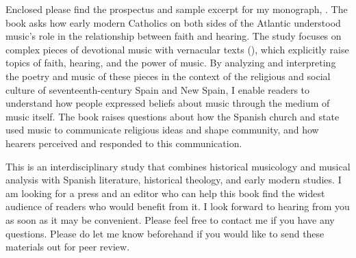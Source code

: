 Enclosed please find the prospectus and sample excerpt for my monograph,
.
The book asks how early modern Catholics on both sides of the Atlantic
understood music's role in the relationship between faith and hearing.
The study focuses on complex pieces of devotional music with vernacular texts
(), which explicitly raise topics of faith, hearing, and the
power of music.
By analyzing and interpreting the poetry and music of these pieces in the
context of the religious and social culture of seventeenth-century Spain and New
Spain, I enable readers to understand how people expressed beliefs about music
through the medium of music itself.
The book raises questions about how the Spanish church and state used music to
communicate religious ideas and shape community, and how hearers perceived and
responded to this communication.

This is an interdisciplinary study that combines historical musicology and
musical analysis with Spanish literature, historical theology, and early modern
studies.
I am looking for a press and an editor who can help this book find the widest
audience of readers who would benefit from it.
I look forward to hearing from you as soon as it may be convenient.
Please feel free to contact me if you have any questions.
Please do let me know beforehand if you would like to send these materials out
for peer review.

\endinput
